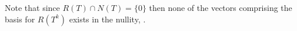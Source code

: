 \documentclass[12pt, letterpaper]{article}
\begin{document}
\begin{enumerate}
\begin{enumerate}
 		
 		
 		Note that since $R(T) \cap N(T) = \{0\}$ then none of the vectors comprising the basis for $R(T^k)$ exists in the nullity, .  
		                                                                                                                                                                                                                                                                                                                                                                                                                                                                                                                                                                                                                                                                                     

\end{enumerate}
\end{enumerate}
\end{document}
